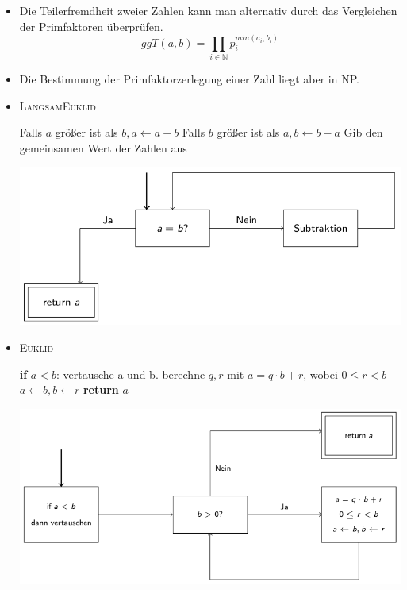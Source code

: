 \documentclass[12pt]{article}
\begin{document}
\begin{itemize}
	\item Die Teilerfremdheit zweier Zahlen kann man alternativ durch das Vergleichen der Primfaktoren \"uberpr\"ufen.
	$$ggT(a,b) = \prod_{i \in \mathbb{N}} p_{i}^{min(a_i,b_i)}$$
	\item Die Bestimmung der Primfaktorzerlegung einer Zahl liegt aber in NP.
	\item \textsc{LangsamEuklid}\\\begin{algorithmic}[1]
	\State Falls $a$ gr\"o{\ss}er ist als $b, a\gets a-b$
	\State Falls $b$ gr\"o{\ss}er ist als $a, b\gets b-a$
\EndWhile
	\State Gib den gemeinsamen Wert der Zahlen aus
\end{algorithmic}
\vspace{10pt}
\begin{center}
\includegraphics[scale=0.4]{langsamEuklid}
\end{center}
\newpage
	\item \textsc{Euklid} \\ \begin{algorithmic}[1]
		\State \textbf{if} $a < b$: vertausche a und b.
		\State berechne $q,r$ mit $a=q\cdot b+r$, wobei $0\leq r < b$
		\State $a\gets b, b\gets r$
		\EndWhile
		\State \textbf{return} $a$
	\end{algorithmic}	
	\begin{center}
	\includegraphics[scale=0.5]{euklid}

\end{center}
\end{itemize}
\end{document}
